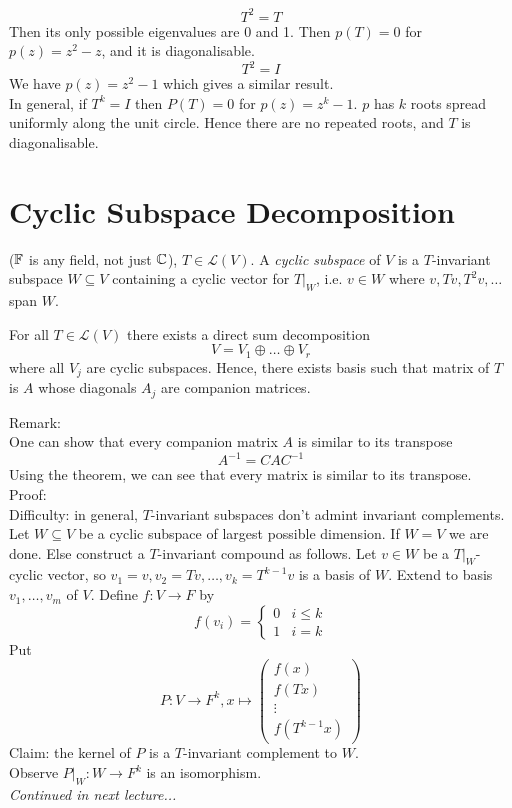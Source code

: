 \documentclass[12pt]{article}
\begin{document}
\begin{ex}
	$$T^2=T$$
	Then its only possible eigenvalues are 0 and 1. Then $p(T)=0$ for $p(z) = z^2-z$, and it is diagonalisable.
	$$T^2=I$$
	We have $p(z) = z^2-1$ which gives a similar result. \\
	In general, if $T^k=I$ then $P(T)=0$ for $p(z) = z^k-1$. $p$ has $k$ roots spread uniformly along the unit circle. Hence there are no repeated roots, and $T$ is diagonalisable.
\end{ex}

\section{Cyclic Subspace Decomposition}

($\mathbb{F}$ is any field, not just $\mathbb{C}$), $T\in\mathcal L(V)$. A \emph{cyclic subspace} of $V$ is a $T$-invariant subspace $W\subseteq V$ containing a cyclic vector for $T|_W$, i.e. $v\in W$ where $v,Tv,T^2v,\dots$ span $W$.

\begin{thm}
	For all $T\in\mathcal L(V)$ there exists a direct sum decomposition
	$$V = V_1\oplus\dots\oplus V_r$$
	where all $V_j$ are cyclic subspaces. Hence, there exists basis such that matrix of $T$ is $A$ whose diagonals $A_j$ are companion matrices.
\end{thm}

Remark: \\
One can show that every companion matrix $A$ is similar to its transpose
$$A^{-1}=CAC^{-1}$$
Using the theorem, we can see that every matrix is similar to its transpose. \\
Proof: \\
Difficulty: in general, $T$-invariant subspaces don't admint invariant complements. \\
Let $W\subseteq V$ be a cyclic subspace of largest possible dimension. If $W=V$ we are done. Else construct a $T$-invariant compound as follows. Let $v\in W$ be a $T|_W$-cyclic vector, so $v_1=v, v_2 = Tv,\dots,v_k=T^{k-1}v$ is a basis of $W$. Extend to basis $v_1,\dots,v_m$ of $V$. Define $f:V\rightarrow F$ by
$$f(v_i) = \begin{cases} 0 & i\leq k \\ 1 & i=k\end{cases}$$
Put
$$P:V\rightarrow F^k, x\mapsto \begin{pmatrix} f(x) \\ f(Tx) \\ \vdots \\ f(T^{k-1}x)\end{pmatrix}$$
Claim: the kernel of $P$ is a $T$-invariant complement to $W$. \\
Observe $P|_W:W\rightarrow F^k$ is an isomorphism. \\
\textit{Continued in next lecture...}
\end{document}
